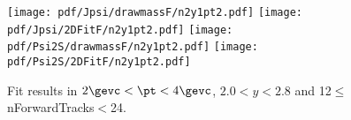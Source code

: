 \begin{figure}[H]
\begin{center}
\texttt{[image: pdf/Jpsi/drawmassF/n2y1pt2.pdf]}
\texttt{[image: pdf/Jpsi/2DFitF/n2y1pt2.pdf]}
\vspace*{-0.5cm}
\texttt{[image: pdf/Psi2S/drawmassF/n2y1pt2.pdf]}
\texttt{[image: pdf/Psi2S/2DFitF/n2y1pt2.pdf]}
\vspace*{-0.5cm}
\end{center}
\caption{Fit results in $2\gevc<\pt<4\gevc$, $2.0<y<2.8$ and 12$\leq$nForwardTracks$<$24.}
\label{Fitn2y1pt2}
\end{figure}
